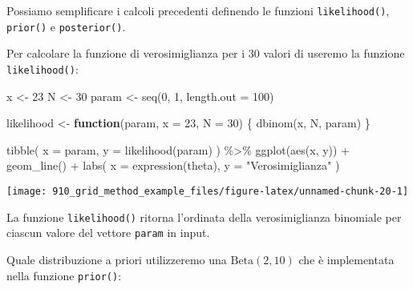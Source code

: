 \documentclass[
]{memoir}
\newenvironment{Shaded}{\begin{snugshade}}{\end{snugshade}}
\newcommand{\AttributeTok}[1]{\textcolor[rgb]{0.77,0.63,0.00}{#1}}
\newcommand{\ControlFlowTok}[1]{\textcolor[rgb]{0.13,0.29,0.53}{\textbf{#1}}}
\newcommand{\DecValTok}[1]{\textcolor[rgb]{0.00,0.00,0.81}{#1}}
\newcommand{\FunctionTok}[1]{\textcolor[rgb]{0.00,0.00,0.00}{#1}}
\newcommand{\NormalTok}[1]{#1}
\newcommand{\OtherTok}[1]{\textcolor[rgb]{0.56,0.35,0.01}{#1}}
\newcommand{\SpecialCharTok}[1]{\textcolor[rgb]{0.00,0.00,0.00}{#1}}
\newcommand{\StringTok}[1]{\textcolor[rgb]{0.31,0.60,0.02}{#1}}
\begin{document}
Possiamo semplificare i calcoli precedenti definendo le funzioni \texttt{likelihood()}, \texttt{prior()} e \texttt{posterior()}.

Per calcolare la funzione di verosimiglianza per i 30 valori di \citet{zetschefuture2019} useremo la funzione \texttt{likelihood()}:

\begin{Shaded}
\begin{Highlighting}[]
\NormalTok{x }\OtherTok{\textless{}{-}} \DecValTok{23}
\NormalTok{N }\OtherTok{\textless{}{-}} \DecValTok{30}
\NormalTok{param }\OtherTok{\textless{}{-}} \FunctionTok{seq}\NormalTok{(}\DecValTok{0}\NormalTok{, }\DecValTok{1}\NormalTok{, }\AttributeTok{length.out =} \DecValTok{100}\NormalTok{)}

\NormalTok{likelihood }\OtherTok{\textless{}{-}} \ControlFlowTok{function}\NormalTok{(param, }\AttributeTok{x =} \DecValTok{23}\NormalTok{, }\AttributeTok{N =} \DecValTok{30}\NormalTok{) \{}
  \FunctionTok{dbinom}\NormalTok{(x, N, param)}
\NormalTok{\}}

\FunctionTok{tibble}\NormalTok{(}
  \AttributeTok{x =}\NormalTok{ param, }
  \AttributeTok{y =} \FunctionTok{likelihood}\NormalTok{(param)}
\NormalTok{) }\SpecialCharTok{\%\textgreater{}\%}
  \FunctionTok{ggplot}\NormalTok{(}\FunctionTok{aes}\NormalTok{(x, y)) }\SpecialCharTok{+}
  \FunctionTok{geom\_line}\NormalTok{() }\SpecialCharTok{+}
  \FunctionTok{labs}\NormalTok{(}
    \AttributeTok{x =} \FunctionTok{expression}\NormalTok{(theta),}
    \AttributeTok{y =} \StringTok{"Verosimiglianza"}
\NormalTok{  )}
\end{Highlighting}
\end{Shaded}

\begin{center}\texttt{[image: 910\_grid\_method\_example\_files/figure-latex/unnamed-chunk-20-1]} \end{center}

\noindent
La funzione \texttt{likelihood()} ritorna l'ordinata della verosimiglianza binomiale per ciascun valore del vettore \texttt{param} in input.

Quale distribuzione a priori utilizzeremo una \(\mbox{Beta}(2, 10)\) che è implementata nella funzione \texttt{prior()}:
\end{document}
